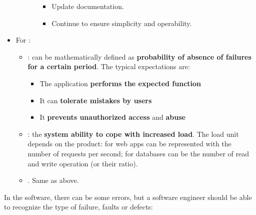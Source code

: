 \begin{itemize}
\begin{itemize}
\begin{enumerate}
\begin{itemize}
                \item Update documentation.

                \item Continue to ensure simplicity and operability.
            \end{itemize}
        \end{enumerate}
    \end{itemize}

    \item For :
    \begin{itemize}
        \item \underline{}: can be mathematically defined as \textbf{probability of absence of failures for a certain period}. The typical expectations are:
        \begin{itemize}
            \item The application \textbf{performs the expected function}
            \item It can \textbf{tolerate mistakes by users}
            \item It \textbf{prevents unauthorized access} and \textbf{abuse}
        \end{itemize}
        
        
        \item \underline{}: the \textbf{system ability to cope with increased load}. The load unit depends on the product: for web apps can be represented with the number of requests per second; for databases can be the number of read and write operation (or their ratio).
        
        
        \item \underline{}. Same as above.
    \end{itemize}
\end{itemize}
In the software, there can be some errors, but a software engineer should be able to recognize the type of failure, faults or defects:
